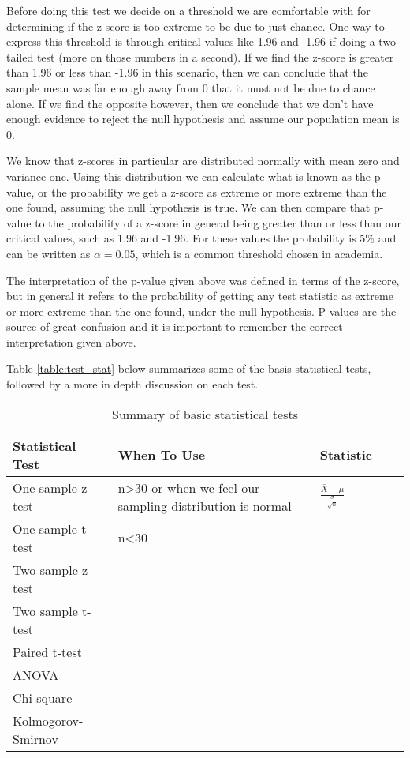 Before doing this test we decide on a threshold we are comfortable with for determining if the z-score is too extreme to be due to just chance. One way to express this threshold is through critical values like 1.96 and -1.96 if doing a two-tailed test (more on those numbers in a second). If we find the z-score is greater than 1.96 or less than -1.96 in this scenario, then we can conclude that the sample mean was far enough away from 0 that it must not be due to chance alone. If we find the opposite however, then we conclude that we don't have enough evidence to reject the null hypothesis and assume our population mean is 0. 

We know that z-scores in particular are distributed normally with mean zero and variance one. Using this distribution we can calculate what is known as the p-value, or the probability we get a z-score as extreme or more extreme than the one found, assuming the null hypothesis is true. We can then compare that p-value to the probability of a z-score in general being greater than or less than our critical values, such as 1.96 and -1.96. For these values the probability is 5\% and can be written as $\alpha=0.05$, which is a common threshold chosen in academia. 

The interpretation of the p-value given above was defined in terms of the z-score, but in general it refers to the probability of getting any test statistic as extreme or more extreme than the one found, under the null hypothesis. P-values are the source of great confusion and it is important to remember the correct interpretation given above.

Table \ref{table:test_stat} below summarizes some of the basis statistical tests, followed by a more in depth discussion on each test.\newline

\begin{table}[b] \label{table:test_stat}
\begin{tabular}{|l|l|l|l|l|}
\hline
Statistical Test & When To Use & Statistic & &  \\ \hline
One sample z-test & n>30 or when we feel our sampling distribution is normal & $\frac{\bar{X} - \mu}{\frac{\sigma}{\sqrt{n}}}$  &  &  \\ \hline
One sample t-test & n<30 &  &  &  \\ \hline
Two sample z-test                      &  &  &  &  \\ \hline
Two sample t-test                      &  &  &  &  \\ \hline
Paired t-test                      &  &  &  &  \\ \hline
ANOVA                      &  &  &  &  \\ \hline
Chi-square                      &  &  &  &  \\ \hline
Kolmogorov-Smirnov                     &  &  &  &  \\ \hline
\end{tabular}
\caption{Summary of basic statistical tests}\label{table:somename}
\end{table}



